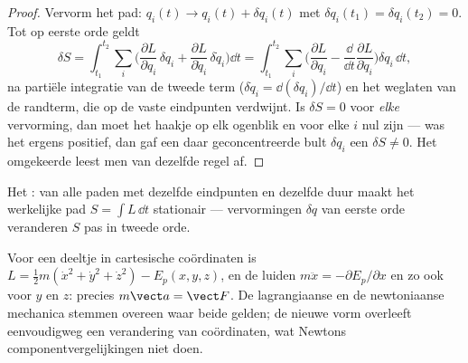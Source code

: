 \begin{proof}
Vervorm het pad: $q_i(t) \to q_i(t) + \delta q_i(t)$ met
$\delta q_i(t_1) = \delta q_i(t_2) = 0$. Tot op eerste orde geldt
\[
\delta S = \int_{t_1}^{t_2}\sum_i\Big(
  \frac{\partial L}{\partial q_i}\,\delta q_i
 + \frac{\partial L}{\partial\dot q_i}\,\delta\dot q_i\Big)\dd t
 = \int_{t_1}^{t_2}\sum_i\Big(
  \frac{\partial L}{\partial q_i}
 - \frac{\dd}{\dd t}\frac{\partial L}{\partial\dot q_i}\Big)\delta q_i\,\dd t ,
\]
na partiële integratie van de tweede term ($\delta\dot q_i =
\dd(\delta q_i)/\dd t$) en het weglaten van de randterm, die op de vaste
eindpunten verdwijnt. Is $\delta S = 0$ voor \emph{elke} vervorming, dan
moet het haakje op elk ogenblik en voor elke $i$ nul zijn --- was het
ergens positief, dan gaf een daar geconcentreerde bult $\delta q_i$ een
$\delta S \neq 0$. Het omgekeerde leest men van dezelfde regel af.
\end{proof}

\begin{omfigure}

{\small Het : van alle paden met dezelfde eindpunten
en dezelfde duur maakt het werkelijke pad $S = \int L\,\dd t$ stationair
--- vervormingen $\delta q$ van eerste orde veranderen $S$ pas in tweede
orde.}
\end{omfigure}

\begin{proposition}\label{prop:b3:lagrangian-mechanics:newton}
Voor een deeltje in cartesische coördinaten is $L = \tfrac12 m(\dot x^2 +
\dot y^2 + \dot z^2) - E_p(x,y,z)$, en de  luiden $m\ddot x = -\partial E_p/\partial x$ en zo ook
voor $y$ en $z$: precies $m\vect a = \vect F$. De lagrangiaanse en de
newtoniaanse mechanica stemmen overeen waar beide gelden; de nieuwe vorm
overleeft eenvoudigweg een verandering van coördinaten, wat Newtons
componentvergelijkingen niet doen.
\end{proposition}

